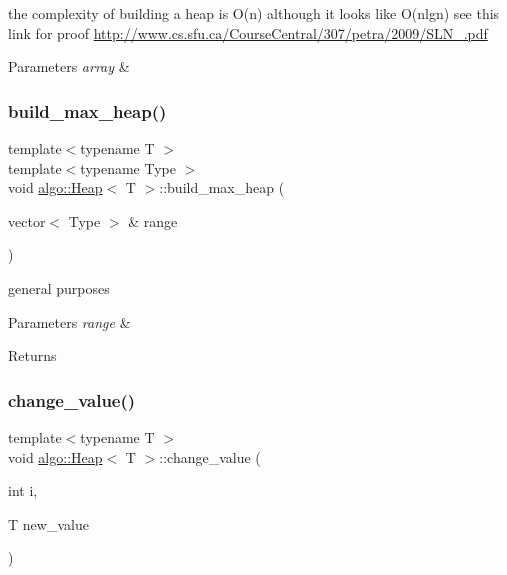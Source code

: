 the complexity of building a heap is O(n) although it looks like O(nlgn) see this link for proof \hyperlink{}{http\+://www.\+cs.\+sfu.\+ca/\+Course\+Central/307/petra/2009/\+S\+L\+N\+\_.\+pdf} 
\begin{DoxyParams}{Parameters}
{\em array} & \\
\hline
\end{DoxyParams}
\mbox{\label{classalgo_1_1_heap_a2586e8fefb80f8019a51a47c5b62251f}} 
\subsubsection{\texorpdfstring{build\+\_\+max\+\_\+heap()}{build\_max\_heap()}\hspace{0.1cm}{\footnotesize\ttfamily [2/2]}}
{\footnotesize\ttfamily template$<$typename T $>$ \\
template$<$typename Type $>$ \\
void \hyperlink{classalgo_1_1_heap}{algo\+::\+Heap}$<$ T $>$\+::build\+\_\+max\+\_\+heap (\begin{DoxyParamCaption}\item[{vector$<$ Type $>$ \&}]{range }\end{DoxyParamCaption})\hspace{0.3cm}{\ttfamily [inline]}}

general purposes 
\begin{DoxyParams}{Parameters}
{\em range} & \\
\hline
\end{DoxyParams}
\begin{DoxyReturn}{Returns}

\end{DoxyReturn}
\mbox{\label{classalgo_1_1_heap_ab3ff726bf97a950f057d0756c4c5d00e}} 
\subsubsection{\texorpdfstring{change\+\_\+value()}{change\_value()}}
{\footnotesize\ttfamily template$<$typename T $>$ \\
void \hyperlink{classalgo_1_1_heap}{algo\+::\+Heap}$<$ T $>$\+::change\+\_\+value (\begin{DoxyParamCaption}\item[{int}]{i,  }\item[{T}]{new\+\_\+value }\end{DoxyParamCaption})\hspace{0.3cm}{\ttfamily [inline]}}

